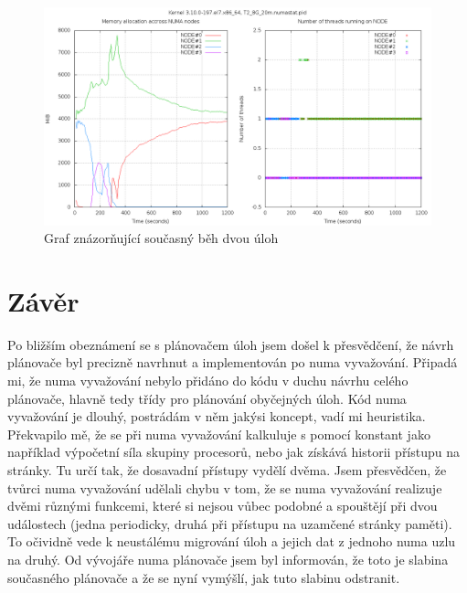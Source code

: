 \documentclass[a4paper,12pt]{article}
\begin{document}
\begin{figure}[ht]
\includegraphics[scale=0.30]{obrazky/PerfBenchResult.png}
\caption{Graf znázorňující současný běh dvou úloh}
\label{PerfBenchResult}
\end{figure}

\section{Závěr}
Po bližším obeznámení se s plánovačem úloh jsem došel k přesvědčení, že návrh plánovače byl precizně navrhnut a implementován po numa vyvažování. Připadá mi, že numa vyvažování nebylo přidáno do kódu v duchu návrhu celého plánovače, hlavně tedy třídy pro plánování obyčejných úloh. Kód numa vyvažování je dlouhý, postrádám v něm jakýsi koncept, vadí mi heuristika. Překvapilo mě, že se při numa vyvažování kalkuluje s pomocí konstant jako například výpočetní síla skupiny procesorů, nebo jak získává historii přístupu na stránky. Tu určí tak, že dosavadní přístupy vydělí dvěma. Jsem přesvědčen, že tvůrci numa vyvažování udělali chybu v tom, že se numa vyvažování realizuje dvěmi různými funkcemi, které si nejsou vůbec podobné a spouštějí při dvou událostech (jedna periodicky, druhá při přístupu na uzamčené stránky paměti). To očividně vede k neustálému migrování úloh a jejich dat z jednoho numa uzlu na druhý. Od vývojáře numa plánovače jsem byl informován, že toto je slabina současného plánovače a že se nyní vymýšlí, jak tuto slabinu odstranit. 

\nocite{*}

\end{document}
